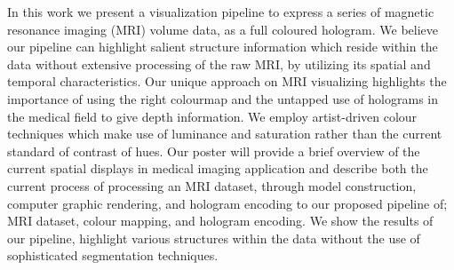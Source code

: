 In this work we present a visualization pipeline to express a series of magnetic resonance imaging (MRI) volume data, as a full coloured hologram.  We believe our pipeline can highlight salient structure information which reside within the data without extensive processing of the raw MRI, by utilizing its spatial and temporal characteristics.  Our unique approach on MRI visualizing highlights the importance of using the right colourmap and the untapped use of holograms in the medical field to give depth information.  We employ artist-driven colour techniques which make use of luminance and saturation rather than the current standard of contrast of hues. Our poster will provide a brief overview of the current spatial displays in medical imaging application and describe both the current process of processing an MRI dataset, through model construction, computer graphic rendering, and hologram encoding to our proposed pipeline of; MRI dataset, colour mapping, and hologram encoding.  We show the results of our pipeline, highlight various structures within the data without the use of sophisticated segmentation techniques.